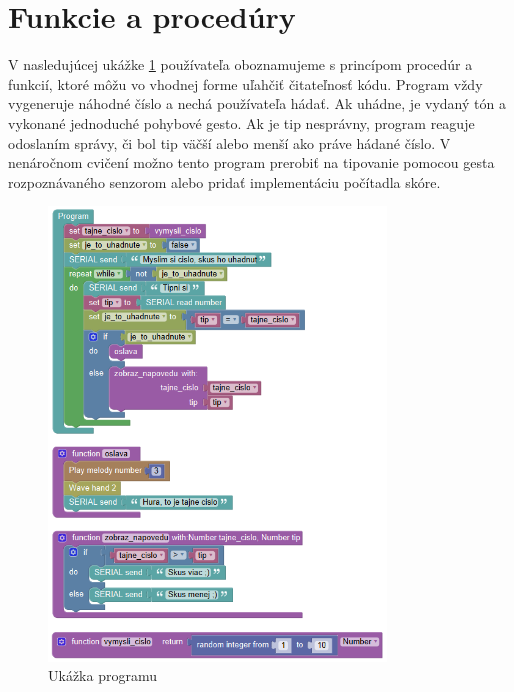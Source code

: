 \section{Funkcie a procedúry}
V nasledujúcej ukážke \ref{obr:guess-number} používateľa oboznamujeme s princípom procedúr a funkcií, ktoré môžu vo vhodnej forme uľahčiť čitateľnosť kódu. Program vždy vygeneruje náhodné číslo a nechá používateľa hádať. Ak uhádne, je vydaný  tón a vykonané jednoduché pohybové gesto. Ak je tip nesprávny, program reaguje odoslaním správy, či bol tip väčší alebo menší ako práve hádané číslo. V nenáročnom cvičení možno tento program prerobiť na tipovanie pomocou gesta rozpoznávaného senzorom alebo pridať implementáciu počítadla skóre.

\begin{figure}[h!]
\centerline{\includegraphics[width=0.8\textwidth]{images/guess-number}}
\caption[Ukážka programu ]{Ukážka programu }
\label{obr:guess-number}
\end{figure}


















